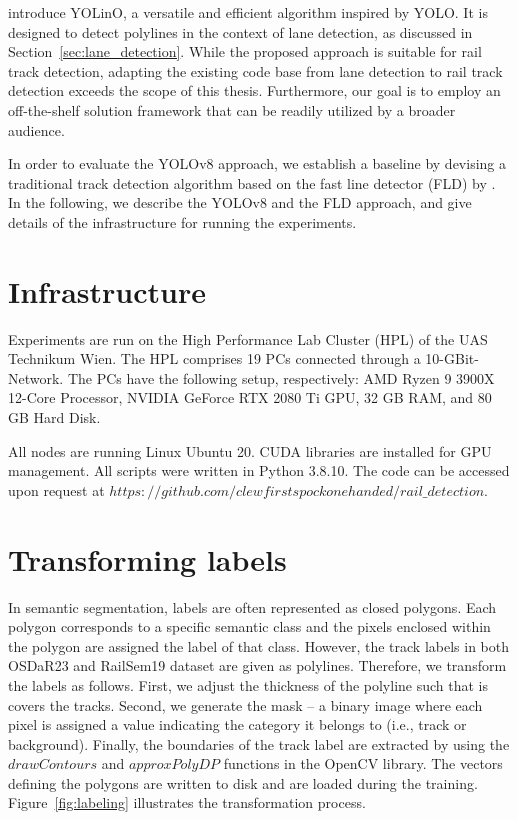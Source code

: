 \documentclass[Master,MDS,english]{BASE/twbook} %
\begin{document}
\cite{meyer2021yolino} introduce YOLinO, a versatile and efficient algorithm inspired by YOLO. It is designed to detect polylines in the context of lane detection, as discussed in Section~\ref{sec:lane_detection}. While the proposed approach is suitable for rail track detection, adapting the existing code base from lane detection to rail track detection exceeds the scope of this thesis. Furthermore, our goal is to employ an off-the-shelf solution framework that can be readily utilized by a broader audience.

In order to evaluate the YOLOv8 approach, we establish a baseline by devising a traditional track detection algorithm based on the fast line detector (FLD) by \cite{FLD}.
In the following, we describe the YOLOv8 and the FLD approach, and give details of the infrastructure for running the experiments.

\section{Infrastructure}

Experiments are run on the High Performance Lab Cluster (HPL) of the UAS Technikum Wien. 
The HPL comprises 19 PCs connected through a 10-GBit-Network. The PCs have the following setup, respectively: AMD Ryzen 9 3900X 12-Core Processor, NVIDIA GeForce RTX 2080 Ti GPU, 32 GB RAM, and 80 GB Hard Disk.

All nodes are running Linux Ubuntu 20. CUDA libraries are installed for GPU management. All scripts were written in Python 3.8.10.  The code can be accessed upon request at $https://github.com/clewfirstspockonehanded/rail\_detection$.


\section{Transforming labels} 

In semantic segmentation, labels are often represented as closed polygons. Each polygon corresponds to a specific semantic class and the pixels enclosed within the polygon are assigned the label of that class.
However, the track labels in both OSDaR23 and RailSem19 dataset are given as polylines. Therefore, we transform the labels as follows. First, we adjust the thickness of the polyline such that is covers the tracks. Second, we generate the mask -- a binary image where each pixel is assigned a value indicating the category it belongs to (i.e., track or background). Finally, the boundaries of the track label are extracted by using the $drawContours$ and $approxPolyDP$ functions in the OpenCV library. The vectors defining the polygons are written to disk and are loaded during the training.  Figure~\ref{fig:labeling} illustrates the transformation process.
\end{document}
